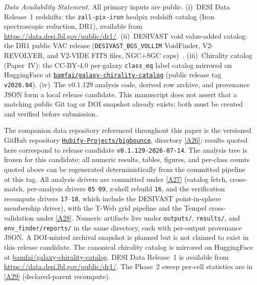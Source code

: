 \documentclass[aps,prd,twocolumn,superscriptaddress,showpacs,preprintnumbers,nofootinbib,longbibliography,floatfix]{revtex4-2}
\newcommand{\repoBase}{https://github.com/Hubify-Projects/bigbounce/blob/main}
\newcommand{\paperVersion}{v0.1.129-2026-07-14}
\begin{document}
\emph{Data Availability Statement.} All primary inputs are public.
(i)~DESI Data Release~1 redshifts: the \texttt{zall-pix-iron} healpix
redshift catalog (Iron spectroscopic reduction, DR1), available from
\url{https://data.desi.lbl.gov/public/dr1/}.
(ii)~DESIVAST void value-added catalog: the DR1 public VAC release
(\texttt{DESIVAST\_BGS\_VOLLIM} VoidFinder, V2-REVOLVER, and V2-VIDE
FITS files, NGC$+$SGC caps)~\cite{DESIVAST2025}.
(iii)~Chirality catalog (Paper~IV): the CC-BY-4.0 per-galaxy
\texttt{class\_eq} label catalog mirrored on HuggingFace at
\href{https://huggingface.co/datasets/bamfai/galaxy-chirality-catalog}%
{\texttt{bamfai/galaxy-chirality-catalog}} (public release tag
\texttt{v2026.04}).
(iv)~The v0.1.129 analysis code, derived row archive, and provenance JSON
form a local release candidate. This manuscript does not assert that a
matching public Git tag or DOI snapshot already exists; both must be
created and verified before submission.

The companion data repository referenced throughout this paper is the
versioned GitHub repository
\href{https://github.com/Hubify-Projects/bigbounce}%
{\texttt{Hubify-Projects/bigbounce}}, directory
\href{\repoBase/pipelines/p5\_desi\_chirality/}{[A26]}; results quoted here
correspond to release candidate \texttt{\paperVersion}. The analysis
tree is frozen for this candidate; all numeric results, tables,
figures, and per-class counts quoted above can be regenerated
deterministically from the committed pipeline at this tag. All analysis
drivers are committed under
\href{\repoBase/pipelines/p5\_desi\_chirality/scripts/}{[A27]} (catalog fetch,
cross-match, per-analysis drivers \texttt{05}--\texttt{09}, z-shell
rebuild \texttt{16}, and the verification recompute drivers
\texttt{17}--\texttt{18}, which include the DESIVAST point-in-sphere
membership driver), with the T-Web grid pipeline and the Tempel
cross-validation under
\href{\repoBase/pipelines/p5\_desi\_chirality/env\_finder/}{[A28]}. Numeric
artifacts live under \texttt{outputs/}, \texttt{results/}, and
\texttt{env\_finder/reports/} in the same directory, each with
per-output provenance JSON. A DOI-minted archival snapshot is planned
but is not claimed to exist in this release candidate. The canonical chirality
catalog is mirrored on HuggingFace at
\href{https://huggingface.co/datasets/bamfai/galaxy-chirality-catalog}%
{bamfai/galaxy-chirality-catalog}. DESI Data Release~1 is available from
\url{https://data.desi.lbl.gov/public/dr1/}. The Phase~2 sweep
per-cell statistics are in
\href{\repoBase/pipelines/p5\_desi\_chirality/env\_finder/reports/02\_phase2\_sweep.csv}{[A29]}
(declared-parent recompute).
\end{document}
